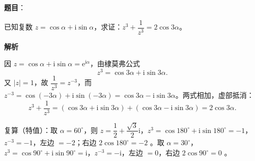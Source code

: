 \begin{answer}

\textbf{题目}：

已知复数 $z=\cos\alpha+\mathrm i\sin\alpha$，求证：$z^3+\dfrac{1}{z^3}=2\cos3\alpha$。

\textbf{解析}

因 $z=\cos\alpha+\mathrm i\sin\alpha=\mathrm e^{\mathrm i\alpha}$，由棣莫弗公式
\nopagebreak[4]
\[
z^3=\cos3\alpha+\mathrm i\sin3\alpha.
\]
又 $|z|=1$，故 $\dfrac1{z^3}=z^{-3}$，而 $z^{-3}=\cos(-3\alpha)+\mathrm i\sin(-3\alpha)=\cos3\alpha-\mathrm i\sin3\alpha$。两式相加，虚部抵消：
\nopagebreak[4]
\[
z^3+\frac1{z^3}=\left(\cos3\alpha+\mathrm i\sin3\alpha\right)+\left(\cos3\alpha-\mathrm i\sin3\alpha\right)=2\cos3\alpha.
\]

复算（特值）：取 $\alpha=60^\circ$，则 $z=\dfrac12+\dfrac{\sqrt3}{2}\mathrm i$，$z^3=\cos180^\circ+\mathrm i\sin180^\circ=-1$，$z^{-3}=-1$，左边 $=-2$；右边 $2\cos180^\circ=-2$ 。取 $\alpha=30^\circ$，$z^3=\cos90^\circ+\mathrm i\sin90^\circ=\mathrm i$，$z^{-3}=-\mathrm i$，左边 $=0$，右边 $2\cos90^\circ=0$ 。


\end{answer}
